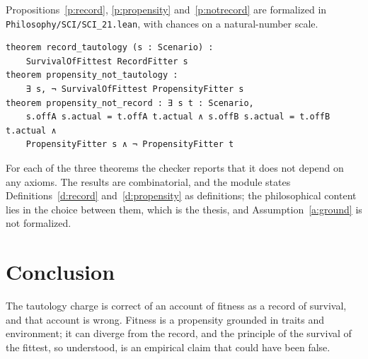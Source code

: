 \documentclass{situationist-preprint}
\begin{document}
Propositions~\ref{p:record}, \ref{p:propensity} and~\ref{p:notrecord} are formalized in \nolinkurl{Philosophy/SCI/SCI_21.lean}, with chances on a natural-number scale.

\begin{lstlisting}
theorem record_tautology (s : Scenario) :
    SurvivalOfFittest RecordFitter s
theorem propensity_not_tautology :
    ∃ s, ¬ SurvivalOfFittest PropensityFitter s
theorem propensity_not_record : ∃ s t : Scenario,
    s.offA s.actual = t.offA t.actual ∧ s.offB s.actual = t.offB t.actual ∧
    PropensityFitter s ∧ ¬ PropensityFitter t
\end{lstlisting}

For each of the three theorems the checker reports that it does not depend on any axioms. The results are combinatorial, and the module states Definitions~\ref{d:record} and~\ref{d:propensity} as definitions; the philosophical content lies in the choice between them, which is the thesis, and Assumption~\ref{a:ground} is not formalized.

\section{Conclusion}

The tautology charge is correct of an account of fitness as a record of survival, and that account is wrong. Fitness is a propensity grounded in traits and environment; it can diverge from the record, and the principle of the survival of the fittest, so understood, is an empirical claim that could have been false.
\end{document}
